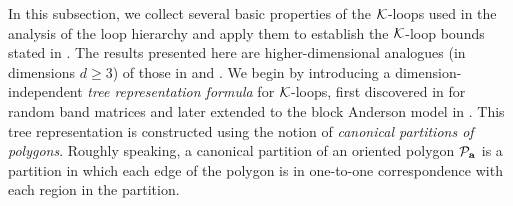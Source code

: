 
In this subsection, we collect several basic properties of the ${\cal K}$-loops used in the analysis of the loop hierarchy and apply them to establish the $\cK$-loop bounds stated in . The results presented here are higher-dimensional analogues (in dimensions $d \ge 3$) of those in \cite[Section 3]{YY_25} and \cite[Section 4]{RBSO1D}. We begin by introducing a dimension-independent \emph{tree representation formula} for $\cal K$-loops, first discovered in \cite{YY_25} for random band matrices and later extended to the block Anderson model in \cite{RBSO1D}. This tree representation is constructed using the notion of \emph{canonical partitions of polygons}. Roughly speaking, a canonical partition of an oriented polygon $\mathcal{P}_{\ba}$ is a partition in which each edge of the polygon is in one-to-one correspondence with each region in the partition. 

